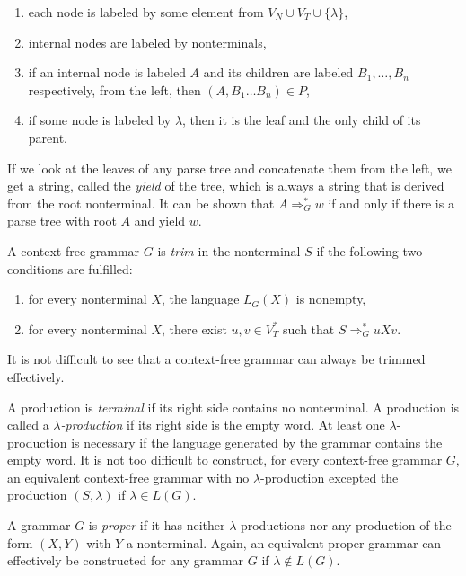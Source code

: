\begin{enumerate}
\item each node is labeled by some element from $V_N \cup V_T \cup \{\lambda\}$,
\item internal nodes are labeled by nonterminals,
\item if an internal node is labeled $A$ and its children are labeled $B_1, \ldots, B_n$ respectively, from the left, then $(A, B_1 \ldots B_n) \in P$,
\item if some node is labeled by $\lambda$, then it is the leaf and the only child of its parent.
\end{enumerate}

If we look at the leaves of any parse tree and concatenate them from the left, we get a string, called the \emph{yield} of the tree, which is always a string that is derived from the root nonterminal. It can be shown that $A \Rightarrow^*_G w$ if and only if there is a parse tree with root $A$ and yield $w$.

A context-free grammar $G$ is \emph{trim} in the nonterminal $S$ if the following two conditions are fulfilled:

\begin{enumerate}
\item for every nonterminal $X$, the language $L_G(X)$ is nonempty,
\item for every nonterminal $X$, there exist $u, v \in V_T^*$ such that $S \Rightarrow^*_G uXv$.
\end{enumerate}

It is not difficult to see that a context-free grammar can always be trimmed effectively.

A production is \emph{terminal} if its right side contains no nonterminal. A production is called a  \emph{$\lambda$-production} if its right side is the empty word. At least one $\lambda$-production is necessary if the language generated by the grammar contains the empty word. It is not too difficult to construct, for every context-free grammar $G$, an equivalent context-free grammar with no $\lambda$-production excepted the production $(S, \lambda)$ if $\lambda \in L(G)$.

A grammar $G$ is \emph{proper} if it has neither $\lambda$-productions nor any production of the form $(X, Y)$ with $Y$ a nonterminal. Again, an equivalent proper grammar can effectively be constructed for any grammar $G$ if $\lambda \notin L(G)$.

